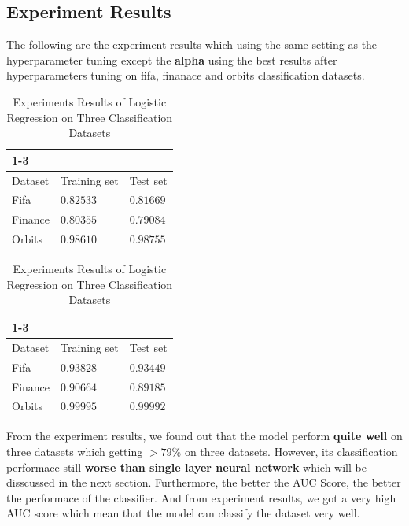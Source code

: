 \documentclass{article}
\begin{document}
\subsection{Experiment Results}

The following are the experiment results which using the same setting as the hyperparameter tuning except the \textbf{alpha} using the best results after hyperparameters tuning on fifa, finanace and orbits classification datasets.

\begin{table}[htb]
	\caption{Experiments Results of Logistic Regression on Three Classification Datasets}
	\label{sample-table}
	\centering
	\begin{tabular}{lll}
		\toprule
		\cmidrule{1-3}
		\multicolumn{3}{c}{Classification Accuracy}\\
		\midrule
		Dataset & Training set & Test set \\
		\midrule
		Fifa & $0.82533$ & $0.81669$  \\
		Finance & $0.80355$  & $0.79084$ \\
		Orbits & $0.98610$  & $0.98755$  \\
		\bottomrule
	\end{tabular}
	\hspace{5mm}
	\centering
	\begin{tabular}{lll}
		\toprule
		\cmidrule{1-3}
		\multicolumn{3}{c}{AUC Score}\\
		\midrule
		Dataset & Training set & Test set \\
		\midrule
		Fifa & $0.93828$ & $0.93449$  \\
		Finance & $0.90664$  & $0.89185$ \\
		Orbits & $0.99995$  & $0.99992$  \\
		\bottomrule
	\end{tabular}
\end{table}

From the experiment results, we found out that the model perform \textbf{quite well} on three datasets which getting $>79\%$ on three datasets. However, its classification performace still \textbf{worse than single layer neural network} which will be disscussed in the next section. Furthermore, the better the AUC Score, the better the performace of the classifier. And from experiment results, we got a very high AUC score which mean that the model can classify the dataset very well.
\end{document}
